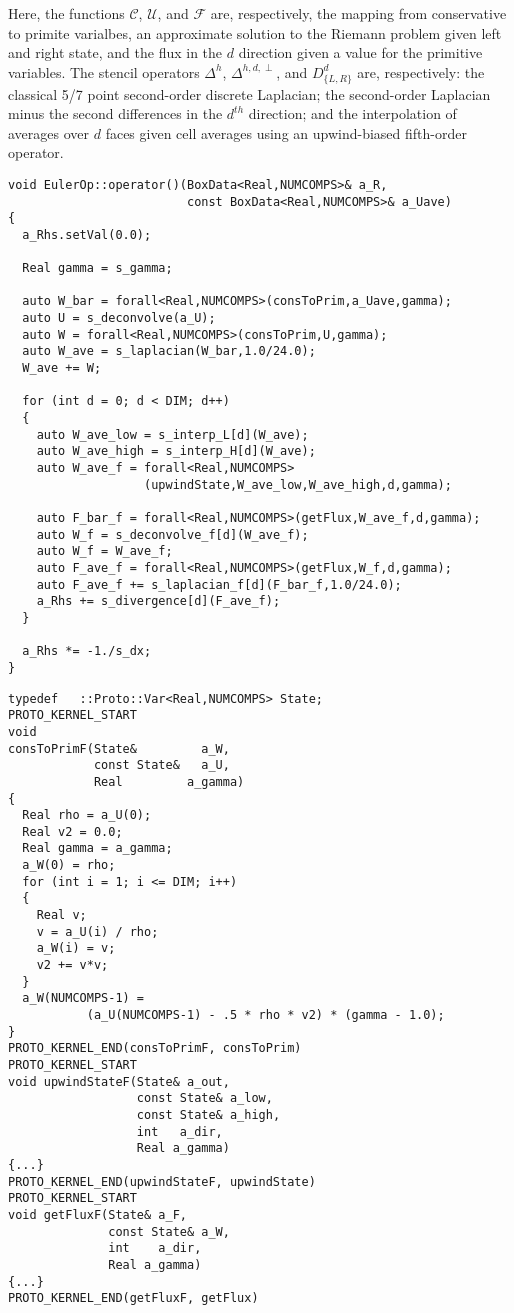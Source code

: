 \documentclass[12pt]{article}
\newcommand{\rhs}{right-hand side }
\begin{document}
Here, the functions $\mathcal{C}$, $\mathcal{U}$, and $\mathcal{F}$ are, respectively, the mapping from conservative to primite varialbes, an approximate solution to the Riemann problem given left and right state, and the flux in the $d$ direction given a value for the primitive variables. The stencil operators $\Delta^h$, $\Delta^{h,d,\perp}$, and $D_{\{L,R\}}^d$ are, respectively: the classical 5/7 point second-order discrete Laplacian; the second-order Laplacian minus the second differences in the $d^{th}$ direction; and the interpolation of averages over $d$ faces given cell averages using an upwind-biased fifth-order operator. 
\begin{lstlisting}[label = eulerOp,caption = High-order upwind \rhs for compressible Euler]
void EulerOp::operator()(BoxData<Real,NUMCOMPS>& a_R,
                         const BoxData<Real,NUMCOMPS>& a_Uave)
{
  a_Rhs.setVal(0.0);

  Real gamma = s_gamma;
  
  auto W_bar = forall<Real,NUMCOMPS>(consToPrim,a_Uave,gamma);
  auto U = s_deconvolve(a_U);
  auto W = forall<Real,NUMCOMPS>(consToPrim,U,gamma);
  auto W_ave = s_laplacian(W_bar,1.0/24.0);
  W_ave += W;

  for (int d = 0; d < DIM; d++)
  {  
    auto W_ave_low = s_interp_L[d](W_ave);
    auto W_ave_high = s_interp_H[d](W_ave);    
    auto W_ave_f = forall<Real,NUMCOMPS>
                   (upwindState,W_ave_low,W_ave_high,d,gamma);  

    auto F_bar_f = forall<Real,NUMCOMPS>(getFlux,W_ave_f,d,gamma);
    auto W_f = s_deconvolve_f[d](W_ave_f);
    auto W_f = W_ave_f;   
    auto F_ave_f = forall<Real,NUMCOMPS>(getFlux,W_f,d,gamma);
    auto F_ave_f += s_laplacian_f[d](F_bar_f,1.0/24.0);
    a_Rhs += s_divergence[d](F_ave_f);
  }

  a_Rhs *= -1./s_dx;
}
\end{lstlisting}
\begin{lstlisting}[label = eulerFunctions,caption = Pointwise functions for Euler]
typedef   ::Proto::Var<Real,NUMCOMPS> State;
PROTO_KERNEL_START
void 
consToPrimF(State&         a_W, 
            const State&   a_U,
            Real         a_gamma)
{
  Real rho = a_U(0);
  Real v2 = 0.0;
  Real gamma = a_gamma;
  a_W(0) = rho;   
  for (int i = 1; i <= DIM; i++)
  {
    Real v;
    v = a_U(i) / rho;        
    a_W(i) = v;
    v2 += v*v;
  }   
  a_W(NUMCOMPS-1) = 
           (a_U(NUMCOMPS-1) - .5 * rho * v2) * (gamma - 1.0);
}
PROTO_KERNEL_END(consToPrimF, consToPrim)
PROTO_KERNEL_START
void upwindStateF(State& a_out,
                  const State& a_low,
                  const State& a_high,
                  int   a_dir,
                  Real a_gamma)
{...}
PROTO_KERNEL_END(upwindStateF, upwindState)
PROTO_KERNEL_START
void getFluxF(State& a_F, 
              const State& a_W, 
              int    a_dir,
              Real a_gamma)
{...}
PROTO_KERNEL_END(getFluxF, getFlux)
\end{lstlisting}
\end{document}
